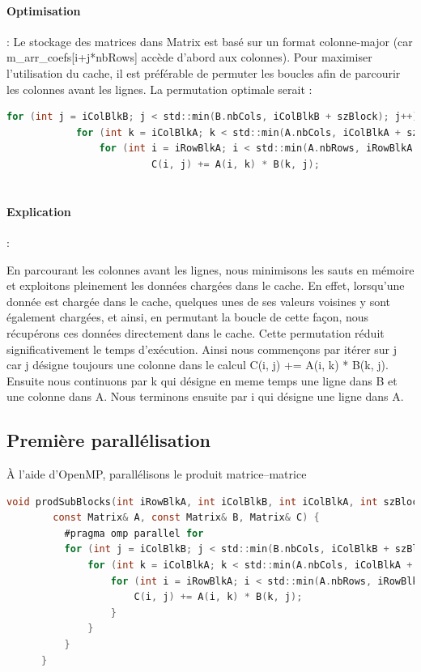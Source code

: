 \documentclass[a4paper,13pt]{book}
\begin{document}
\paragraph{Optimisation} : 
Le stockage des matrices dans Matrix est basé sur un format colonne-major  (car m\_arr\_coefs[i+j*nbRows] accède d'abord aux colonnes). Pour maximiser l'utilisation du cache, il est préférable de permuter les boucles afin de parcourir les colonnes avant les lignes. La permutation optimale serait :\\

	\begin{lstlisting}[language=C]
        for (int j = iColBlkB; j < std::min(B.nbCols, iColBlkB + szBlock); j++) 
            for (int k = iColBlkA; k < std::min(A.nbCols, iColBlkA + szBlock); k++) 
                for (int i = iRowBlkA; i < std::min(A.nbRows, iRowBlkA + szBlock); ++i) 
                         C(i, j) += A(i, k) * B(k, j);
                    
    \end{lstlisting}

\paragraph{Explication} :  

    En parcourant les colonnes avant les lignes, nous minimisons les sauts en mémoire et exploitons pleinement les données chargées dans le cache. En effet, lorsqu'une donnée est chargée dans le cache, quelques unes de ses valeurs voisines y sont également chargées, et ainsi, en permutant la boucle de cette façon, nous récupérons ces données directement dans le cache.
    Cette permutation réduit significativement le temps d'exécution. Ainsi nous commençons par itérer sur j car j désigne toujours une colonne dans le calcul C(i, j) += A(i, k) * B(k, j). Ensuite nous continuons par k qui désigne en meme temps une ligne dans B et une colonne dans A. Nous terminons ensuite par i qui désigne une ligne dans A.

\subsection{Première parallélisation}
À l’aide d’OpenMP, parallélisons le produit matrice–matrice  


	\begin{lstlisting}[language=C]
        void prodSubBlocks(int iRowBlkA, int iColBlkB, int iColBlkA, int szBlock,
        const Matrix& A, const Matrix& B, Matrix& C) {
          #pragma omp parallel for
          for (int j = iColBlkB; j < std::min(B.nbCols, iColBlkB + szBlock); j++) {
              for (int k = iColBlkA; k < std::min(A.nbCols, iColBlkA + szBlock); k++) {
                  for (int i = iRowBlkA; i < std::min(A.nbRows, iRowBlkA + szBlock); ++i) {
                      C(i, j) += A(i, k) * B(k, j);
                  }
              }
          }
      }
    \end{lstlisting}
\end{document}
